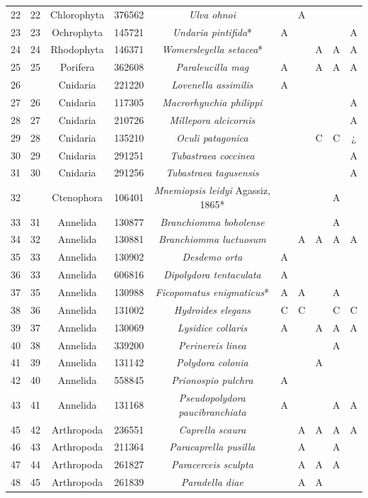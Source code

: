 \documentclass{article}
\begin{document}
\begin{landscape}
\begin{center}
\begin{longtable}{|c|c|c|c|c|c|c|c|c|c|}
22&22&Chlorophyta&376562&\textit{Ulva ohnoi}&&A&&&\\
23&23&Ochrophyta&145721&\textit{Undaria pintifida}*&A&&&&A\\
24&24&Rhodophyta&146371&\textit{Womersleyella setacea}*&&&A&A&A\\
25&25&Porifera&362608&\textit{Paraleucilla mag}&A&&A&A&A\\
26&&Cnidaria&221220&\textit{Lovenella assimilis}&A&&&&\\
27&26&Cnidaria&117305&\textit{Macrorhynchia philippi}&&&&&A\\
28&27&Cnidaria&210726&\textit{Millepora alcicornis}&&&&&A\\
29&28&Cnidaria&135210&\textit{Oculi patagonica}&&&C&C&¿\\
30&29&Cnidaria&291251&\textit{Tubastraea coccinea}&&&&&A\\
31&30&Cnidaria&291256&\textit{Tubastraea tagusensis}&&&&&A\\
32&&Ctenophora&106401&\textit{Mnemiopsis leidyi} Agassiz, 1865*&&&&A&\\
33&31&Annelida&130877&\textit{Branchiomma boholense}&&&&A&\\
34&32&Annelida&130881&\textit{Branchiomma luctuosum}&&A&A&A&A\\
35&33&Annelida&130902&\textit{Desdemo orta}&A&&&&\\
36&33&Annelida&606816&\textit{Dipolydora tentaculata}&A&&&&\\
37&35&Annelida&130988&\textit{Ficopomatus enigmaticus}*&A&A&&A&\\
38&36&Annelida&131002&\textit{Hydroides elegans}&C&C&&C&C\\
39&37&Annelida&130069&\textit{Lysidice collaris}&A&&A&A&A\\
40&38&Annelida&339200&\textit{Perinereis linea}&&&&A&\\
41&39&Annelida&131142&\textit{Polydora colonia}&&&A&&\\
42&40&Annelida&558845&\textit{Prionospio pulchra}&A&&&&\\
43&41&Annelida&131168&\textit{Pseudopolydora paucibranchiata}&A&&&A&A\\
45&42&Arthropoda&236551&\textit{Caprella scaura}&&A&A&A&A\\
46&43&Arthropoda&211364&\textit{Paracaprella pusilla}&&A&&A&\\
47&44&Arthropoda&261827&\textit{Paracerceis sculpta}&&A&A&A&\\
48&45&Arthropoda&261839&\textit{Paradella diae}&&A&A&&\\

\end{longtable}
\end{center}
\end{landscape}
\end{document}
